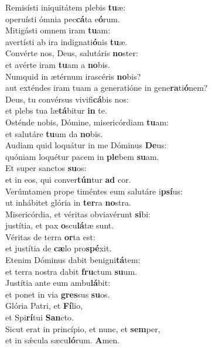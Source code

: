\evenverse Remisísti iniquitátem plebis \textbf{tu}æ:~\*\\
\evenverse operuísti ómnia pec\textbf{cá}ta e\textbf{ó}rum.\\
\oddverse Mitigásti omnem iram \textbf{tu}am:~\*\\
\oddverse avertísti ab ira indignati\textbf{ó}nis \textbf{tu}æ.\\
\evenverse Convérte nos, Deus, salutáris \textbf{no}ster:~\*\\
\evenverse et avérte iram \textbf{tu}am a \textbf{no}bis.\\
\oddverse Numquid in ætérnum irascéris \textbf{no}bis?~\*\\
\oddverse aut exténdes iram tuam a generatióne in gene\textbf{ra}ti\textbf{ó}nem?\\
\evenverse Deus, tu convérsus vivifi\textbf{cá}bis nos:~\*\\
\evenverse et plebs tua læ\textbf{tá}bitur \textbf{in} te.\\
\oddverse Osténde nobis, Dómine, misericórdiam \textbf{tu}am:~\*\\
\oddverse et salutáre \textbf{tu}um da \textbf{no}bis.\\
\evenverse Audiam quid loquátur in me Dóminus \textbf{De}us:~\*\\
\evenverse quóniam loquétur pacem in \textbf{ple}bem \textbf{su}am.\\
\oddverse Et super sanctos \textbf{su}os:~\*\\
\oddverse et in eos, qui conver\textbf{tún}tur \textbf{ad} cor.\\
\evenverse Verúmtamen prope timéntes eum salutáre i\textbf{psí}us:~\*\\
\evenverse ut inhábitet glória in \textbf{ter}ra \textbf{no}stra.\\
\oddverse Misericórdia, et véritas obviavérunt \textbf{si}bi:~\*\\
\oddverse justítia, et pax \textbf{o}scu\textbf{lá}tæ sunt.\\
\evenverse Véritas de terra \textbf{or}ta est:~\*\\
\evenverse et justítia de \textbf{cæ}lo pro\textbf{spé}xit.\\
\oddverse Etenim Dóminus dabit benigni\textbf{tá}tem:~\*\\
\oddverse et terra nostra dabit \textbf{fru}ctum \textbf{su}um.\\
\evenverse Justítia ante eum ambu\textbf{lá}bit:~\*\\
\evenverse et ponet in via \textbf{gres}sus \textbf{su}os.\\
\oddverse Glória Patri, et \textbf{Fí}lio,~\*\\
\oddverse et Spi\textbf{rí}tui \textbf{San}cto.\\
\evenverse Sicut erat in princípio, et nunc, et \textbf{sem}per,~\*\\
\evenverse et in sǽcula sæcu\textbf{ló}rum. \textbf{A}men.\\
